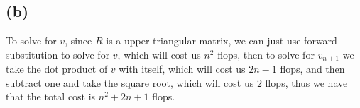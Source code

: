 \subsection*{(b)}
To solve for $v$, since $R$ is a upper triangular matrix, we can just use
forward substitution to solve for $v$, which will cost us $n^2$ flops, 
then to solve for $v_{n+1}$ we take the dot product of $v$ with itself,
which will cost us $2n-1$ flops, and then subtract one and take the square 
root, which will cost us $2$ flops, thus we have that the total cost is
$\boxed{n^2+2n+1}$ flops.






